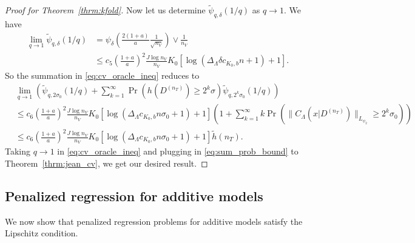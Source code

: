 \documentclass[10pt]{book}
\theoremstyle{definition}
\begin{document}
\begin{proof}[Proof for Theorem~\ref{thrm:kfold}]
	Now let us determine $\tilde{\psi}_{q, \delta}(1/q)$ as $q \rightarrow 1$.
	We have
	\begin{align}
	\lim_{q\rightarrow1}\tilde{\psi}_{q,\delta}(1/q)
	& = \psi_{\delta}\left(\frac{2(1+a)}{a}\frac{1}{\sqrt{n_{V}}}\right)\vee\frac{1}{n_{V}}\\
	& \le
	c_{5} \left (\frac{1+a}{a} \right )^2 \frac{J\log n_{V}}{n_{V}}
	K_0\left[\log\left(\Delta_{\Lambda}\delta c_{K_0, b} n +1\right)+1\right].
	\end{align}
	So the summation in \eqref{eq:cv_oracle_ineq} reduces to
	\begin{align}
	& \lim_{q \rightarrow 1} \left(
	\tilde{\psi}_{q,2\sigma_0}(1/q)
	+\sum_{k=1}^{\infty}
	\Pr\left(h\left(D^{(n_{T})}\right)\ge2^{k}\sigma\right)
	\tilde{\psi}_{q,2^{k}\sigma_0}(1/q)
	\right)
	\\
	& \le
	c_{6} \left (\frac{1+a}{a} \right )^2 \frac{J\log n_{V}}{n_{V}}
	K_0\left[\log\left(\Delta_{\Lambda} c_{K_0, b} n \sigma_0 +1\right)+1\right]
	\left(
	1 + 
	\sum_{k=1}^{\infty}
	k \Pr\left(\|C_\Lambda(x|D^{(n_{T})})\|_{L_{\psi_{2}}} \ge 2^{k} \sigma_0\right)
	\right)
	\\
	& \le
	c_{6} \left (\frac{1+a}{a} \right )^2 \frac{J\log n_{V}}{n_{V}}
	K_0\left[\log\left(\Delta_{\Lambda} c_{K_0, b} n \sigma_0 +1\right)+1\right]
	\tilde{h}(n_{T}).
	\label{eq:sum_prob_bound}
	\end{align}
	Taking $q \rightarrow 1$ in \eqref{eq:cv_oracle_ineq} and plugging in \eqref{eq:sum_prob_bound} to Theorem~\ref{thrm:jean_cv}, we get our desired result.
\end{proof}

\subsection{Penalized regression for additive models}

We now show that penalized regression problems for additive models satisfy the Lipschitz condition.
\end{document}
